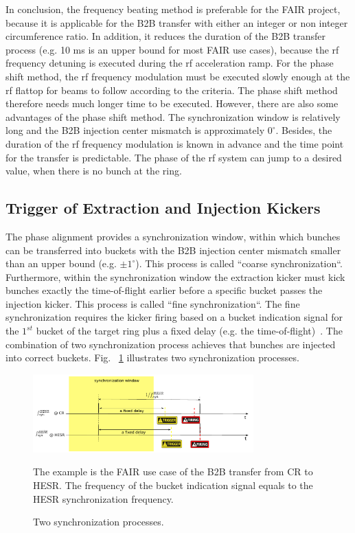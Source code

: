 In conclusion, the frequency beating method is preferable for the FAIR project, because it is applicable for the B2B transfer with either an integer or non integer circumference ratio. In addition, it reduces the duration of the B2B transfer process (e.g. 10 ms is an upper bound for most FAIR use cases), because the rf frequency detuning is executed during the rf acceleration ramp. For the phase shift method, the rf frequency modulation must be executed slowly enough at the rf flattop for beams to follow according to the criteria. The phase shift method therefore needs much longer time to be executed. However, there are also some advantages of the phase shift method. The synchronization window is relatively long and the B2B injection center mismatch is approximately $0^\circ$. Besides, the duration of the rf frequency modulation is known in advance and the time point for the transfer is predictable. The phase of the rf system can jump to a desired value, when there is no bunch at the ring.  
\subsection{Trigger of Extraction and Injection Kickers}
The phase alignment provides a synchronization window, within which bunches can be transferred into buckets with the B2B injection center mismatch smaller than an upper bound (e.g. $\pm1^\circ$). This process is called ``coarse synchronization``. Furthermore, within the synchronization window the extraction kicker must kick bunches exactly the time-of-flight earlier before a specific bucket passes the injection kicker. This process is called ``fine synchronization``. The fine synchronization requires the kicker firing based on a bucket indication signal for the $1^\mathit{st}$ bucket of the target ring plus a fixed delay (e.g. the time-of-flight)~\cite{bai_f-tc-c-05_2016}. The combination of two synchronization process achieves that bunches are injected into correct buckets. Fig. ~\ref{ext_inj_kicker1} illustrates two synchronization processes.
\begin{figure}[!htb]
   \centering   
   \includegraphics*[width=85mm]{ext_inj_ill2.pdf}
   \caption{Two synchronization processes.}
{\small{The example is the FAIR use case of the B2B transfer from CR to HESR. The frequency of the bucket indication signal equals to the HESR synchronization frequency.}}
   \label{ext_inj_kicker1}
\end{figure}

